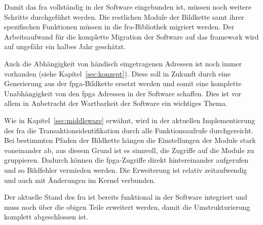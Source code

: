
Damit das \ac{fra} vollständig in der Software eingebunden ist, müssen noch weitere Schritte durchgeführt werden. Die restlichen Module der Bildkette samt ihrer spezifischen Funktionen müssen in die \ac{fra}-Bibliothek migriert werden. Der Arbeitsaufwand für die komplette Migration der Software auf das \gls{framework} wird auf ungefähr ein halbes Jahr geschätzt.

Auch die Abhängigkeit von händisch eingetragenen Adressen ist noch immer vorhanden (siehe Kapitel~\ref{sec:konzept}). Diese soll in Zukunft durch eine Generierung aus der \ac{fpga}-Bildkette ersetzt werden und somit eine komplette Unabhängigkeit von den \ac{fpga} Adressen in der Software schaffen. Dies ist vor allem in Anbetracht der Wartbarkeit der Software ein wichtiges Thema.

Wie in Kapitel~\ref{sec:middleware} erwähnt, wird in der aktuellen Implementierung des \ac{fra} die Transaktionsidentifikation durch alle Funktionsaufrufe durchgereicht. Bei bestimmten Pfaden der Bildkette hängen die Einstellungen der Module stark voneinander ab, aus diesem Grund ist es sinnvoll, die Zugriffe auf die Module zu gruppieren. Dadurch können die \ac{fpga}-Zugriffe direkt hintereinander aufgerufen und so Bildfehler vermieden werden.
Die Erweiterung ist relativ zeitaufwendig und auch mit Änderungen im Kernel verbunden.


Der aktuelle Stand des \ac{fra} ist bereits funktional in der Software integriert und muss noch über die obigen Teile erweitert werden, damit die Umstrukturierung komplett abgeschlossen ist.



















